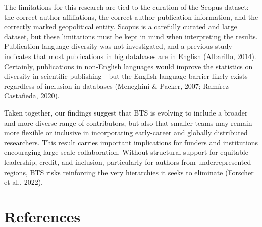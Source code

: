 \documentclass[
  man,floatsintext]{apa7}
\begin{document}
The limitations for this research are tied to the curation of the Scopus
dataset: the correct author affiliations, the correct author publication
information, and the correctly marked geopolitical entity. Scopus is a
carefully curated and large dataset, but these limitations must be kept
in mind when interpreting the results. Publication language diversity
was not investigated, and a previous study indicates that most
publications in big databases are in English (Albarillo, 2014).
Certainly, publications in non-English languages would improve the
statistics on diversity in scientific publishing - but the English
language barrier likely exists regardless of inclusion in databases
(Meneghini \& Packer, 2007; Ramírez-Castañeda, 2020).

Taken together, our findings suggest that BTS is evolving to include a
broader and more diverse range of contributors, but also that smaller
teams may remain more flexible or inclusive in incorporating
early-career and globally distributed researchers. This result carries
important implications for funders and institutions encouraging
large-scale collaboration. Without structural support for equitable
leadership, credit, and inclusion, particularly for authors from
underrepresented regions, BTS risks reinforcing the very hierarchies it
seeks to eliminate (Forscher et al., 2022).

\newpage

\section{References}\label{references}
\end{document}
